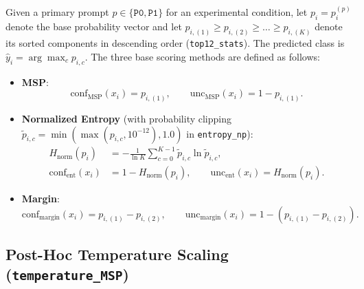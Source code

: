 \documentclass[11pt,a4paper]{article}
\begin{document}
Given a primary prompt $p \in \{\texttt{P0}, \texttt{P1}\}$ for an experimental condition, let $p_i = p_i^{(p)}$ denote the base probability vector and let $p_{i,(1)} \ge p_{i,(2)} \ge \dots \ge p_{i,(K)}$ denote its sorted components in descending order (\texttt{top12\_\allowbreak{}stats}). The predicted class is $\hat{y}_i = \arg\max_{c} p_{i,c}$. The three base scoring methods are defined as follows:
\begin{itemize}
  \item \textbf{MSP}:
  \begin{equation}
    \text{conf}_{\text{MSP}}(x_i) = p_{i,(1)}, \qquad \text{unc}_{\text{MSP}}(x_i) = 1 - p_{i,(1)}.
  \end{equation}
  \item \textbf{Normalized Entropy} (with probability clipping $\tilde{p}_{i,c} = \min(\max(p_{i,c}, 10^{-12}), 1.0)$ in \texttt{entropy\_\allowbreak{}np}):
  \begin{equation}
  \begin{aligned}
    H_{\text{norm}}(p_i) &= -\frac{1}{\ln K} \sum_{c=0}^{K-1} \tilde{p}_{i,c} \ln \tilde{p}_{i,c}, \\
    \text{conf}_{\text{ent}}(x_i) &= 1 - H_{\text{norm}}(p_i), \qquad
    \text{unc}_{\text{ent}}(x_i) = H_{\text{norm}}(p_i).
  \end{aligned}
  \end{equation}
  \item \textbf{Margin}:
  \begin{equation}
    \text{conf}_{\text{margin}}(x_i) = p_{i,(1)} - p_{i,(2)}, \qquad
    \text{unc}_{\text{margin}}(x_i) = 1 - \left(p_{i,(1)} - p_{i,(2)}\right).
  \end{equation}
\end{itemize}

\subsection{Post-Hoc Temperature Scaling (\texttt{temperature\_\allowbreak{}MSP})}
\end{document}
